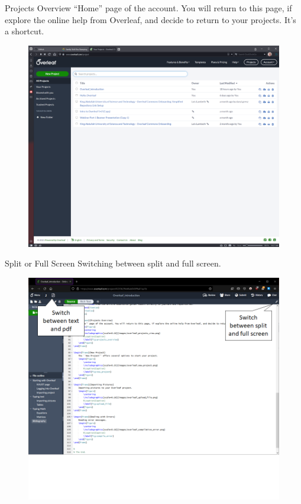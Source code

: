 \documentclass[aspectratio=169]{beamer}
\begin{document}
\begin{frame}{Projects Overview}
    ``Home'' page of the account. You will return to this page, if explore the online help from Overleaf, and decide to return to your projects. It's a shortcut.
    \begin{figure}
        \centering
        \includegraphics[scale=0.18]{images/overleaf_projects_view.png}
        \label{fig:projects_overview}
    \end{figure}
\end{frame}

\begin{frame}{Split or Full Screen}
    Switching between split and full screen.
    \begin{figure}
        \centering
        \includegraphics[scale=0.35]{images/overleaf_single_split_screen.png}
        \label{fig:split_full_screen}
    \end{figure}
\end{frame}
\end{document}
